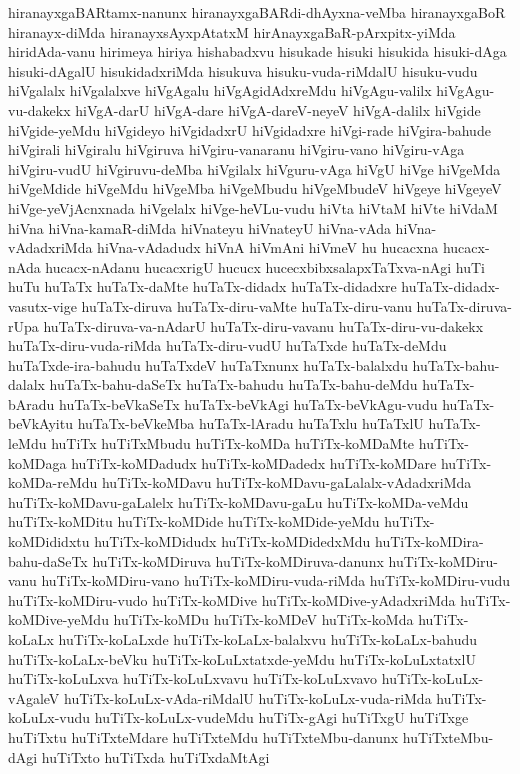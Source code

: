 {hiranayxgaBARtamx-nanunx
hiranayxgaBARdi-dhAyxna-veMba
hiranayxgaBoR
hiranayx-diMda
hiranayxsAyxpAtatxM
hirAnayxgaBaR-pArxpitx-yiMda
hiridAda-vanu
hirimeya
hiriya
hishabadxvu
hisukade
hisuki
hisukida
hisuki-dAga
hisuki-dAgalU
hisukidadxriMda
hisukuva
hisuku-vuda-riMdalU
hisuku-vudu
hiVgalalx
hiVgalalxve
hiVgAgalu
hiVgAgidAdxreMdu
hiVgAgu-valilx
hiVgAgu-vu-dakekx
hiVgA-darU
hiVgA-dare
hiVgA-dareV-neyeV
hiVgA-dalilx
hiVgide
hiVgide-yeMdu
hiVgideyo
hiVgidadxrU
hiVgidadxre
hiVgi-rade
hiVgira-bahude
hiVgirali
hiVgiralu
hiVgiruva
hiVgiru-vanaranu
hiVgiru-vano
hiVgiru-vAga
hiVgiru-vudU
hiVgiruvu-deMba
hiVgilalx
hiVguru-vAga
hiVgU
hiVge
hiVgeMda
hiVgeMdide
hiVgeMdu
hiVgeMba
hiVgeMbudu
hiVgeMbudeV
hiVgeye
hiVgeyeV
hiVge-yeVjAcnxnada
hiVgelalx
hiVge-heVLu-vudu
hiVta
hiVtaM
hiVte
hiVdaM
hiVna
hiVna-kamaR-diMda
hiVnateyu
hiVnateyU
hiVna-vAda
hiVna-vAdadxriMda
hiVna-vAdadudx
hiVnA
hiVmAni
hiVmeV
hu
hucacxna
hucacx-nAda
hucacx-nAdanu
hucacxrigU
hucucx
hucecxbibxsalapxTaTxva-nAgi
huTi
huTu
huTaTx
huTaTx-daMte
huTaTx-didadx
huTaTx-didadxre
huTaTx-didadx-vasutx-vige
huTaTx-diruva
huTaTx-diru-vaMte
huTaTx-diru-vanu
huTaTx-diruva-rUpa
huTaTx-diruva-va-nAdarU
huTaTx-diru-vavanu
huTaTx-diru-vu-dakekx
huTaTx-diru-vuda-riMda
huTaTx-diru-vudU
huTaTxde
huTaTx-deMdu
huTaTxde-ira-bahudu
huTaTxdeV
huTaTxnunx
huTaTx-balalxdu
huTaTx-bahu-dalalx
huTaTx-bahu-daSeTx
huTaTx-bahudu
huTaTx-bahu-deMdu
huTaTx-bAradu
huTaTx-beVkaSeTx
huTaTx-beVkAgi
huTaTx-beVkAgu-vudu
huTaTx-beVkAyitu
huTaTx-beVkeMba
huTaTx-lAradu
huTaTxlu
huTaTxlU
huTaTx-leMdu
huTiTx
huTiTxMbudu
huTiTx-koMDa
huTiTx-koMDaMte
huTiTx-koMDaga
huTiTx-koMDadudx
huTiTx-koMDadedx
huTiTx-koMDare
huTiTx-koMDa-reMdu
huTiTx-koMDavu
huTiTx-koMDavu-gaLalalx-vAdadxriMda
huTiTx-koMDavu-gaLalelx
huTiTx-koMDavu-gaLu
huTiTx-koMDa-veMdu
huTiTx-koMDitu
huTiTx-koMDide
huTiTx-koMDide-yeMdu
huTiTx-koMDididxtu
huTiTx-koMDidudx
huTiTx-koMDidedxMdu
huTiTx-koMDira-bahu-daSeTx
huTiTx-koMDiruva
huTiTx-koMDiruva-danunx
huTiTx-koMDiru-vanu
huTiTx-koMDiru-vano
huTiTx-koMDiru-vuda-riMda
huTiTx-koMDiru-vudu
huTiTx-koMDiru-vudo
huTiTx-koMDive
huTiTx-koMDive-yAdadxriMda
huTiTx-koMDive-yeMdu
huTiTx-koMDu
huTiTx-koMDeV
huTiTx-koMda
huTiTx-koLaLx
huTiTx-koLaLxde
huTiTx-koLaLx-balalxvu
huTiTx-koLaLx-bahudu
huTiTx-koLaLx-beVku
huTiTx-koLuLxtatxde-yeMdu
huTiTx-koLuLxtatxlU
huTiTx-koLuLxva
huTiTx-koLuLxvavu
huTiTx-koLuLxvavo
huTiTx-koLuLx-vAgaleV
huTiTx-koLuLx-vAda-riMdalU
huTiTx-koLuLx-vuda-riMda
huTiTx-koLuLx-vudu
huTiTx-koLuLx-vudeMdu
huTiTx-gAgi
huTiTxgU
huTiTxge
huTiTxtu
huTiTxteMdare
huTiTxteMdu
huTiTxteMbu-danunx
huTiTxteMbu-dAgi
huTiTxto
huTiTxda
huTiTxdaMtAgi
}
